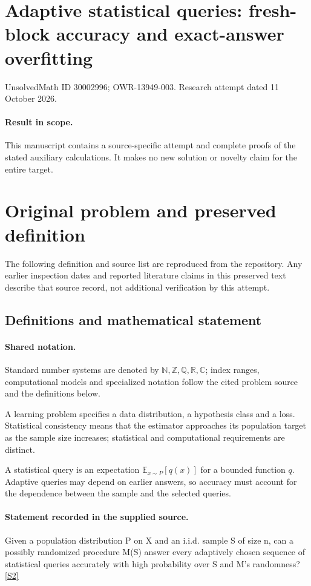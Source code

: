 \documentclass[11pt]{article}
\begin{document}
\section*{Adaptive statistical queries: fresh-block accuracy and exact-answer overfitting}
\noindent UnsolvedMath ID 30002996; OWR-13949-003. Research attempt dated 11 October 2026.
\paragraph{Result in scope.}This manuscript contains a source-specific attempt and complete proofs of the stated auxiliary calculations. It makes no new solution or novelty claim for the entire target.
\section{Original problem and preserved definition}
The following definition and source list are reproduced from the repository. Any earlier inspection dates and reported literature claims in this preserved text describe that source record, not additional verification by this attempt.
\subsection{Definitions and mathematical statement}

\paragraph{Shared notation.}Standard number systems are denoted by $\mathbb N,\mathbb Z,\mathbb Q,\mathbb R,\mathbb C$; index ranges, computational models and specialized notation follow the cited problem source and the definitions below.


A learning problem specifies a data distribution, a hypothesis class and a loss. Statistical consistency means that the estimator approaches its population target as the sample size increases; statistical and computational requirements are distinct.

A statistical query is an expectation $\mathbb E_{x\sim P}[q(x)]$ for a bounded function $q$. Adaptive queries may depend on earlier answers, so accuracy must account for the dependence between the sample and the selected queries.
\paragraph{Statement recorded in the supplied source.}
Given a population distribution P on X and an i.i.d. sample S of size n, can a possibly randomized procedure M(S) answer every adaptively chosen sequence of statistical queries accurately with high probability over S and M's randomness? \href{https://doi.org/10.4171/owr/2015/54}{[S2]}
\end{document}
